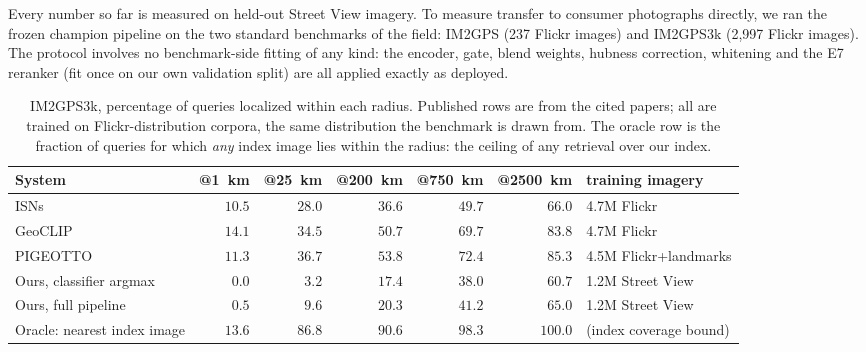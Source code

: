 \documentclass[11pt,a4paper]{article}
\begin{document}
Every number so far is measured on held-out Street View imagery. To measure transfer to
consumer photographs directly, we ran the frozen champion pipeline on the two standard
benchmarks of the field: IM2GPS \cite{hays2008im2gps} (237 Flickr images) and IM2GPS3k
\cite{vo2017revisiting} (2{,}997 Flickr images). The protocol involves no benchmark-side
fitting of any kind: the encoder, gate, blend weights, hubness correction, whitening and the
E7 reranker (fit once on our own validation split) are all applied exactly as deployed.

\begin{table}[t]
\centering
\footnotesize
\setlength{\tabcolsep}{4pt}
\begin{tabular}{lrrrrrl}
\toprule
System & @1~km & @25~km & @200~km & @750~km & @2500~km & training imagery \\
\midrule
ISNs \cite{mullerbudack2018geolocation} & $10.5$ & $28.0$ & $36.6$ & $49.7$ & $66.0$ & 4.7M Flickr \\
GeoCLIP \cite{cepeda2023geoclip} & $14.1$ & $34.5$ & $50.7$ & $69.7$ & $83.8$ & 4.7M Flickr \\
PIGEOTTO \cite{haas2024pigeon} & $11.3$ & $36.7$ & $53.8$ & $72.4$ & $85.3$ & 4.5M Flickr+landmarks \\
\midrule
Ours, classifier argmax & $0.0$ & $3.2$ & $17.4$ & $38.0$ & $60.7$ & 1.2M Street View \\
Ours, full pipeline & $0.5$ & $9.6$ & $20.3$ & $41.2$ & $65.0$ & 1.2M Street View \\
\midrule
Oracle: nearest index image & $13.6$ & $86.8$ & $90.6$ & $98.3$ & $100.0$ & (index coverage bound) \\
\bottomrule
\end{tabular}
\caption{IM2GPS3k, percentage of queries localized within each radius. Published rows are
from the cited papers; all are trained on Flickr-distribution corpora, the same distribution
the benchmark is drawn from. The oracle row is the fraction of queries for which \emph{any}
index image lies within the radius: the ceiling of any retrieval over our index.}
\label{tab:im2gps3k}
\end{table}
\end{document}
